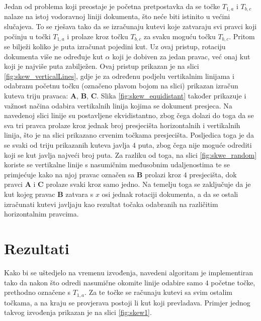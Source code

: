 \documentclass[times, utf8, zavrsni, numeric]{fer}
\begin{document}
Jedan od problema koji preostaje je početna pretpostavka da se točke $T_{1, a}$ i $T_{b, c}$ nalaze na istoj vodoravnoj liniji dokumenta, što neće biti istinito u većini slučajeva.
To se rješava tako da se izračunaju kutevi koje zatvaraju svi pravci koji počinju u točki $T_{1, a}$ i prolaze kroz točku $T_{b, c}$ za svaku moguću točku $T_{b, c}$.
Pritom se bilježi koliko je puta izračunat pojedini kut.
Uz ovaj pristup, rotaciju dokumenta više ne određuje kut $\alpha$ koji je dobiven za jedan pravac, već onaj kut koji je najviše puta zabilježen.
Ovaj pristup prikazan je na slici \ref{fig:skew_verticalLines}, gdje je za određenu podjelu vertikalnim linijama i odabranu početnu točku (označeno plavom bojom na slici) prikazan izračun kuteva triju pravaca: \textbf{A}, \textbf{B}, \textbf{C}.
Slika \ref{fig:skew_equidistant} također prikazuje i važnost načina odabira vertikalnih linija kojima se dokument presjeca.
Na navedenoj slici linije su postavljene ekvidistantno, zbog čega dolazi do toga da se sva tri pravca prolaze kroz jednak broj presjecišta horizontalnih i vertikalnih linija, što je na slici prikazano crvenim točkama presjecišta.
Posljedica toga je da se svaki od triju prikazanih kuteva javlja $4$ puta, zbog čega nije moguće odrediti koji se kut javlja najveći broj puta.
Za razliku od toga, na slici \ref{fig:skwe_random} koriste se vertikalne linije s nasumičnim međusobnim udaljenostima te se primjećuje kako na njoj pravac označen sa \textbf{B} prolazi kroz $4$ presjecišta, dok pravci \textbf{A} i \textbf{C} prolaze svaki kroz samo jedno.
Na temelju toga se zaključuje da je kut kojeg pravac \textbf{B} zatvara s $x$ osi jednak rotaciji dokumenta, a da se ostali izračunati kutevi javljaju kao rezultat točaka odabranih na različitim horizontalnim pravcima.

\section{Rezultati}
Kako bi se uštedjelo na vremenu izvođenja, navedeni algoritam je implementiran tako da nakon što odredi nasumične okomite linije odabire samo $4$ početne točke, prethodno označene s $T_{1, a}$.
Za te točke se računaju kutevi sa svim ostalim točkama, a na kraju se provjerava postoji li kut koji prevladava.
Primjer jednog takvog izvođenja prikazan je na slici \ref{fig:skew1}.\\
\end{document}
